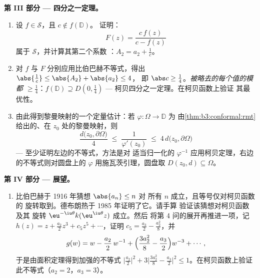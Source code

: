 \begin{problem}
\medskip
\noindent\textbf{第 III 部分 --- 四分之一定理。}
\begin{enumerate}[resume]
  \item 设 $f \in \mathcal S$，且 $c \notin f(\mathbb D)$。
        证明：
        \[
        F(z) = \frac{c\,f(z)}{c - f(z)}
        \]
        属于 $\mathcal S$，并计算其第二个系数
        ：$A_2 = a_2 + \frac1c$。
  \item 对 $f$ 与 $F$ 分别应用比伯巴赫不等式，得出
        $\abs{\frac1c} \leq \abs{A_2} + \abs{a_2} \leq 4$，
        即 $\abs c \geq \frac14$。\emph{被略去的每个值的模都
        $\geq \frac14$}：$f(\mathbb D) \supseteq
        D(0, \frac14)$ --- 柯贝四分之一定理。在柯贝函数上验证
        其最优性。
  \item 由此得到黎曼映射的一个定量估计：若
        $\varphi \colon \Omega \to \mathbb D$ 为
        由\cref{thm:b3:conformal:rmt}给出的、在 $z_0$ 处的黎曼映射，则
        \[
        \frac{d\bigl(z_0, \partial\Omega\bigr)}{4}
        \;\leq\; \frac1{\varphi'(z_0)} \;\leq\;
        4\,d\bigl(z_0, \partial\Omega\bigr)
        \]
        --- 至少证明左边的不等式，方法是对
        适当归一化的 $\varphi^{-1}$ 应用柯贝定理，右边
        的不等式则对圆盘上的 $\varphi$ 用施瓦茨引理，圆盘取
        $D(z_0, d) \subseteq \Omega$。
\end{enumerate}

\medskip
\noindent\textbf{第 IV 部分 --- 展望。}
\begin{enumerate}[resume]
  \item 比伯巴赫于 1916 年猜想 $\abs{a_n} \leq n$ 对
        所有 $n$ 成立，且等号仅对柯贝函数的
        旋转取到。德布朗热于 1985 年证明了它。请手算
        验证该猜想对柯贝函数及其
        旋转 $\eu^{-\iu\theta}k(\eu^{\iu\theta}z)$ 成立。然后
        将第 4 问的展开再推进一项，记
        $h(z) = z + \frac{a_2}2z^3 + c_5z^5 + \cdots$，证明
        $c_5 = \frac{a_3}2 - \frac{a_2^2}8$，并
        \[
        g(w) = w - \frac{a_2}{2}\,w^{-1} +
        \Bigl(\frac{3a_2^2}8 - \frac{a_3}2\Bigr)w^{-3} +
        \cdots ,
        \]
        于是由面积定理得到加强的不等式
        $\bigl|\frac{a_2}2\bigr|^2 + 3\bigl|\frac{3a_2^2}8 -
        \frac{a_3}2\bigr|^2 \leq 1$。在柯贝函数上验证
        此不等式（$a_2 = 2$，$a_3 = 3$）。
\end{enumerate}


\end{problem}
